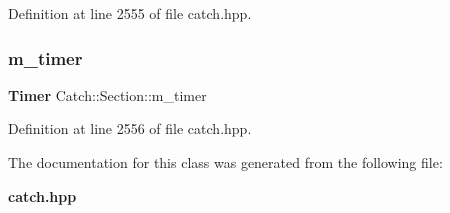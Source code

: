 Definition at line 2555 of file catch.\+hpp.

\mbox{\label{class_catch_1_1_section_a1548993afa64305a1b093391c6884b7e}} 
\subsubsection{m\_timer}
{\footnotesize\ttfamily \textbf{ Timer} Catch\+::\+Section\+::m\+\_\+timer\hspace{0.3cm}{\ttfamily [private]}}



Definition at line 2556 of file catch.\+hpp.



The documentation for this class was generated from the following file\+:\begin{DoxyCompactItemize}
\item 
\textbf{ catch.\+hpp}\end{DoxyCompactItemize}
